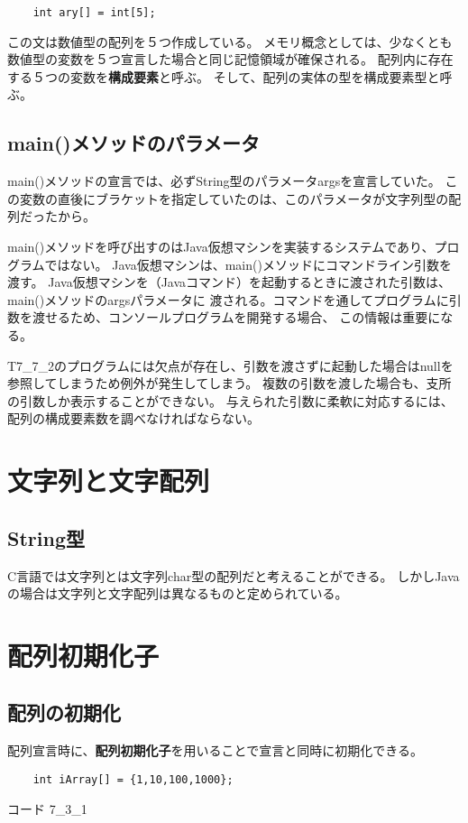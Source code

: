 \documentclass[12pt,a4j,twoside]{jsbook}
\begin{document}
\begin{lstlisting}
    int ary[] = int[5];
\end{lstlisting}
この文は数値型の配列を５つ作成している。
メモリ概念としては、少なくとも数値型の変数を５つ宣言した場合と同じ記憶領域が確保される。
配列内に存在する５つの変数を\textbf{構成要素}と呼ぶ。
そして、配列の実体の型を構成要素型と呼ぶ。

\subsection{main()メソッドのパラメータ}
main()メソッドの宣言では、必ずString型のパラメータargsを宣言していた。
この変数の直後にブラケットを指定していたのは、このパラメータが文字列型の配列だったから。

main()メソッドを呼び出すのはJava仮想マシンを実装するシステムであり、プログラムではない。
Java仮想マシンは、main()メソッドにコマンドライン引数を渡す。
Java仮想マシンを（Javaコマンド）を起動するときに渡された引数は、main()メソッドのargsパラメータに
渡される。コマンドを通してプログラムに引数を渡せるため、コンソールプログラムを開発する場合、
この情報は重要になる。

T7\_7\_2のプログラムには欠点が存在し、引数を渡さずに起動した場合はnullを参照してしまうため例外が発生してしまう。
複数の引数を渡した場合も、支所の引数しか表示することができない。
与えられた引数に柔軟に対応するには、配列の構成要素数を調べなければならない。

\section{文字列と文字配列}
\subsection{String型}
C言語では文字列とは文字列char型の配列だと考えることができる。
しかしJavaの場合は文字列と文字配列は異なるものと定められている。

\section{配列初期化子}
\subsection{配列の初期化}
配列宣言時に、\textbf{配列初期化子}を用いることで宣言と同時に初期化できる。

\begin{lstlisting}
    int iArray[] = {1,10,100,1000};
\end{lstlisting}
コード 7\_3\_1
\end{document}
